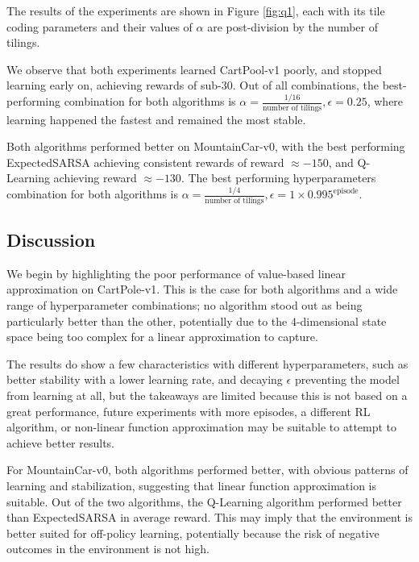 \documentclass{article}
\begin{document}
The results of the experiments are shown in Figure \ref{fig:q1},  each with its tile coding
parameters and their values of $\alpha$ are post-division by the number of tilings.




We observe that both experiments learned CartPool-v1 poorly, and stopped learning
early on, achieving rewards of sub-$30$. Out of all combinations, the best-performing combination for both
algorithms is $\alpha = \frac{1/16}{\text{number of tilings}}, \epsilon = 0.25$, where learning
happened the fastest and remained the most stable.




Both algorithms performed better on MountainCar-v0, with the best performing ExpectedSARSA achieving consistent rewards of
reward $\approx -150$, and Q-Learning achieving reward $\approx -130$. The best performing hyperparameters
combination for both algorithms is $\alpha = \frac{1/4}{\text{number of tilings}}, \epsilon = 1\times
0.995^{\text{episode}}$.




\subsection{Discussion}
We begin by highlighting the poor performance of value-based linear approximation on CartPole-v1. This is
the case for both algorithms and a wide range of hyperparameter combinations; no algorithm
stood out as being particularly better than the other, potentially due to the 4-dimensional state space being too complex for a linear approximation to capture.




The results do show a few characteristics with different hyperparameters, such as better stability with a
lower learning rate, and decaying $\epsilon$ preventing the model from learning at all, but
the takeaways are limited because this is not based on a great performance,
future experiments with more episodes, a different RL algorithm, or non-linear function approximation
may be suitable to attempt to achieve better results.




For MountainCar-v0, both algorithms performed better, with obvious patterns of learning and
stabilization, suggesting that linear function approximation is suitable.
Out of the two algorithms, the Q-Learning algorithm performed better than ExpectedSARSA in average reward.
This may imply that the environment is better suited for off-policy learning, potentially
because the risk of negative outcomes in the environment is not high.
\end{document}

